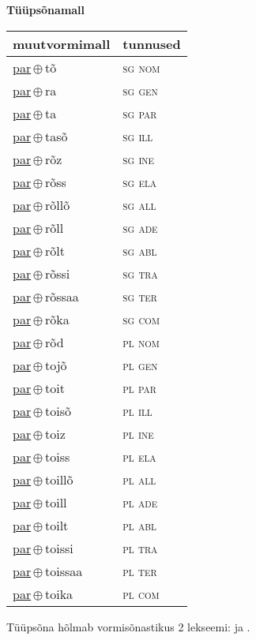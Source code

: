 

\vspace{3.5em}
\noindent \begin{minipage}{\textwidth}
\noindent \textbf{Tüüpsõnamall \,}\\

\begin{sideways}
\begin{tabular}{l l}
muutvormimall & tunnused \\
\hline
\underline{par}\,$\oplus$\,tõ & \textsc{ sg nom } \\
\underline{par}\,$\oplus$\,ra & \textsc{ sg gen } \\
\underline{par}\,$\oplus$\,ta & \textsc{ sg par } \\
\underline{par}\,$\oplus$\,tasõ & \textsc{ sg ill } \\
\underline{par}\,$\oplus$\,rõz & \textsc{ sg ine } \\
\underline{par}\,$\oplus$\,rõss & \textsc{ sg ela } \\
\underline{par}\,$\oplus$\,rõllõ & \textsc{ sg all } \\
\underline{par}\,$\oplus$\,rõll & \textsc{ sg ade } \\
\underline{par}\,$\oplus$\,rõlt & \textsc{ sg abl } \\
\underline{par}\,$\oplus$\,rõssi & \textsc{ sg tra } \\
\underline{par}\,$\oplus$\,rõssaa & \textsc{ sg ter } \\
\underline{par}\,$\oplus$\,rõka & \textsc{ sg com } \\
\underline{par}\,$\oplus$\,rõd & \textsc{ pl nom } \\
\underline{par}\,$\oplus$\,tojõ & \textsc{ pl gen } \\
\underline{par}\,$\oplus$\,toit & \textsc{ pl par } \\
\underline{par}\,$\oplus$\,toisõ & \textsc{ pl ill } \\
\underline{par}\,$\oplus$\,toiz & \textsc{ pl ine } \\
\underline{par}\,$\oplus$\,toiss & \textsc{ pl ela } \\
\underline{par}\,$\oplus$\,toillõ & \textsc{ pl all } \\
\underline{par}\,$\oplus$\,toill & \textsc{ pl ade } \\
\underline{par}\,$\oplus$\,toilt & \textsc{ pl abl } \\
\underline{par}\,$\oplus$\,toissi & \textsc{ pl tra } \\
\underline{par}\,$\oplus$\,toissaa & \textsc{ pl ter } \\
\underline{par}\,$\oplus$\,toika & \textsc{ pl com } \\
\end{tabular}
\end{sideways}
\label{tab:tüüpsõnamall-partõ}

\end{minipage}

 
\vspace{1em}
\noindent Tüüpsõna hõlmab vormisõnastikus 2 lekseemi:  ja .
